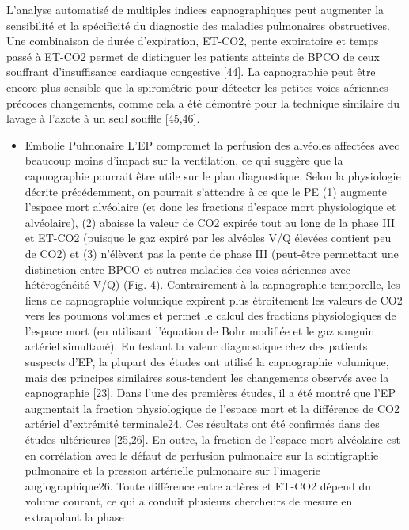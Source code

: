 \documentclass[12pt,]{article}
\providecommand{\tightlist}{%
  \setlength{\itemsep}{0pt}\setlength{\parskip}{0pt}}
\begin{document}
L'analyse automatisé de multiples indices capnographiques peut augmenter
la sensibilité et la spécificité du diagnostic des maladies pulmonaires
obstructives. Une combinaison de durée d'expiration, ET-CO2, pente
expiratoire et temps passé à ET-CO2 permet de distinguer les patients
atteints de BPCO de ceux souffrant d'insuffisance cardiaque congestive
{[}44{]}. La capnographie peut être encore plus sensible que la
spirométrie pour détecter les petites voies aériennes précoces
changements, comme cela a été démontré pour la technique similaire du
lavage à l'azote à un seul souffle {[}45,46{]}.

\begin{itemize}
\tightlist
\item
  Embolie Pulmonaire L'EP compromet la perfusion des alvéoles affectées
  avec beaucoup moins d'impact sur la ventilation, ce qui suggère que la
  capnographie pourrait être utile sur le plan diagnostique. Selon la
  physiologie décrite précédemment, on pourrait s'attendre à ce que le
  PE (1) augmente l'espace mort alvéolaire (et donc les fractions
  d'espace mort physiologique et alvéolaire), (2) abaisse la valeur de
  CO2 expirée tout au long de la phase III et ET-CO2 (puisque le gaz
  expiré par les alvéoles V/Q élevées contient peu de CO2) et (3)
  n'élèvent pas la pente de phase III (peut-être permettant une
  distinction entre BPCO et autres maladies des voies aériennes avec
  hétérogénéité V/Q) (Fig. 4). Contrairement à la capnographie
  temporelle, les liens de capnographie volumique expirent plus
  étroitement les valeurs de CO2 vers les poumons volumes et permet le
  calcul des fractions physiologiques de l'espace mort (en utilisant
  l'équation de Bohr modifiée et le gaz sanguin artériel simultané). En
  testant la valeur diagnostique chez des patients suspects d'EP, la
  plupart des études ont utilisé la capnographie volumique, mais des
  principes similaires sous-tendent les changements observés avec la
  capnographie {[}23{]}. Dans l'une des premières études, il a été
  montré que l'EP augmentait la fraction physiologique de l'espace mort
  et la différence de CO2 artériel d'extrémité terminale24. Ces
  résultats ont été confirmés dans des études ultérieures {[}25,26{]}.
  En outre, la fraction de l'espace mort alvéolaire est en corrélation
  avec le défaut de perfusion pulmonaire sur la scintigraphie pulmonaire
  et la pression artérielle pulmonaire sur l'imagerie angiographique26.
  Toute différence entre artères et ET-CO2 dépend du volume courant, ce
  qui a conduit plusieurs chercheurs de mesure en extrapolant la phase

\end{itemize}
\end{document}
